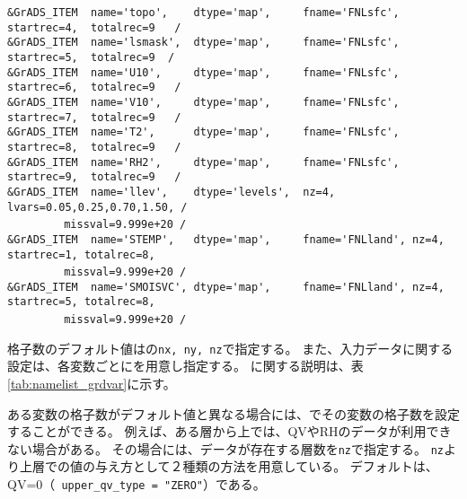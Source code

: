 {\verb|&GrADS_ITEM  name='topo',    dtype='map',     fname='FNLsfc', startrec=4,  totalrec=9   / |  \\
\verb|&GrADS_ITEM  name='lsmask',  dtype='map',     fname='FNLsfc', startrec=5,  totalrec=9  /  |  \\
\verb|&GrADS_ITEM  name='U10',     dtype='map',     fname='FNLsfc', startrec=6,  totalrec=9   / |  \\
\verb|&GrADS_ITEM  name='V10',     dtype='map',     fname='FNLsfc', startrec=7,  totalrec=9   / |  \\
\verb|&GrADS_ITEM  name='T2',      dtype='map',     fname='FNLsfc', startrec=8,  totalrec=9   / |  \\
\verb|&GrADS_ITEM  name='RH2',     dtype='map',     fname='FNLsfc', startrec=9,  totalrec=9   / |  \\
\verb|&GrADS_ITEM  name='llev',    dtype='levels',  nz=4, lvars=0.05,0.25,0.70,1.50, /        |  \\
~~~~~~~~\verb| missval=9.999e+20 /|  \\
\verb|&GrADS_ITEM  name='STEMP',   dtype='map',     fname='FNLland', nz=4, startrec=1, totalrec=8,|\\
~~~~~~~~\verb| missval=9.999e+20 /|  \\
\verb|&GrADS_ITEM  name='SMOISVC', dtype='map',     fname='FNLland', nz=4, startrec=5, totalrec=8,|\\
~~~~~~~~\verb| missval=9.999e+20 /|  \\
}


格子数のデフォルト値はの\verb|nx, ny, nz|で指定する。
また、入力データに関する設定は、各変数ごとにを用意し指定する。
に関する説明は、表\ref{tab:namelist_grdvar}に示す。

ある変数の格子数がデフォルト値と異なる場合には、でその変数の格子数を設定することができる。
例えば、ある層から上では、QVやRHのデータが利用できない場合がある。
その場合には、データが存在する層数を\verb|nz|で指定する。
\verb|nz|より上層での値の与え方として２種類の方法を用意している。
デフォルトは、QV=0（\verb| upper_qv_type = "ZERO"|）である。

